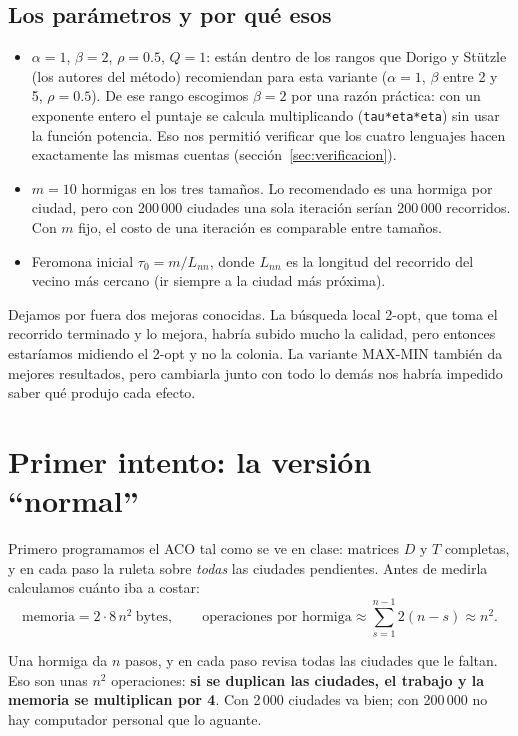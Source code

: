 \documentclass[11pt,a4paper]{article}
\begin{document}
\subsection{Los parámetros y por qué esos}

\begin{itemize}[itemsep=1pt]
\item $\alpha=1$, $\beta=2$, $\rho=0.5$, $Q=1$: están dentro de los rangos que Dorigo y
  Stützle (los autores del método) recomiendan para esta variante ($\alpha=1$,
  $\beta$ entre 2 y 5, $\rho=0.5$). De ese rango escogimos $\beta=2$ por una razón
  práctica: con un exponente entero el puntaje se calcula multiplicando
  (\texttt{tau*eta*eta}) sin usar la función potencia. Eso nos permitió verificar que
  los cuatro lenguajes hacen exactamente las mismas cuentas
  (sección~\ref{sec:verificacion}).
\item $m=10$ hormigas en los tres tamaños. Lo recomendado es una hormiga por ciudad,
  pero con 200\,000 ciudades una sola iteración serían 200\,000 recorridos. Con $m$
  fijo, el costo de una iteración es comparable entre tamaños.
\item Feromona inicial $\tau_0=m/L_{nn}$, donde $L_{nn}$ es la longitud del recorrido
  del vecino más cercano (ir siempre a la ciudad más próxima).
\end{itemize}

Dejamos por fuera dos mejoras conocidas. La búsqueda local 2-opt, que toma el
recorrido terminado y lo mejora, habría subido mucho la calidad, pero entonces
estaríamos midiendo el 2-opt y no la colonia. La variante MAX-MIN también da mejores
resultados, pero cambiarla junto con todo lo demás nos habría impedido saber qué
produjo cada efecto.

\section{Primer intento: la versión ``normal''}

Primero programamos el ACO tal como se ve en clase: matrices $D$ y $T$ completas, y en
cada paso la ruleta sobre \emph{todas} las ciudades pendientes. Antes de medirla
calculamos cuánto iba a costar:
\[
\text{memoria}=2\cdot 8\,n^2\ \text{bytes},\qquad
\text{operaciones por hormiga}\approx\textstyle\sum_{s=1}^{n-1}2(n-s)\approx n^2 .
\]

\begin{simple}
Una hormiga da $n$ pasos, y en cada paso revisa todas las ciudades que le faltan.
Eso son unas $n^2$ operaciones: \textbf{si se duplican las ciudades, el trabajo y la
memoria se multiplican por 4}. Con 2\,000 ciudades va bien; con 200\,000 no hay
computador personal que lo aguante.
\end{simple}
\end{document}
